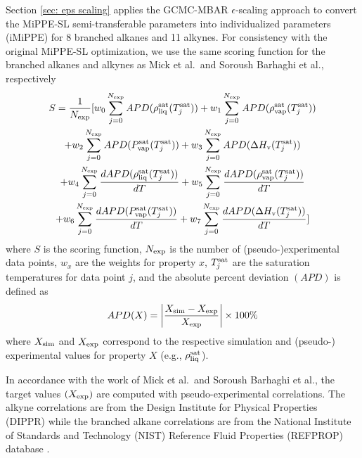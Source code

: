 \documentclass[journal=jced,manuscript=article]{achemso}
\begin{document}
Section \ref{sec: eps scaling} applies the GCMC-MBAR $\epsilon$-scaling approach to convert the MiPPE-SL semi-transferable parameters into individualized parameters (iMiPPE) for 8 branched alkanes and 11 alkynes. For consistency with the original MiPPE-SL optimization, we use the same scoring function for the branched alkanes and alkynes as Mick et al.~and Soroush Barhaghi et al., respectively
\begin{multline} \label{eq: Score}
S= \frac{1}{N_{\rm exp}} [ w_0 \sum_{j=0}^{N_{\rm exp}} APD(\rho_{\rm liq}^{\rm sat}(T^{\rm sat}_j)) + w_1 \sum_{j=0}^{N_{\rm exp}} APD(\rho_{\rm vap}^{\rm sat}(T^{\rm sat}_j)) \\ + w_2 \sum_{j=0}^{N_{\rm exp}} APD(P_{\rm vap}^{\rm sat}(T^{\rm sat}_j)) + w_3 \sum_{j=0}^{N_{\rm exp}} APD(\Delta H_{\rm v} (T^{\rm sat}_j)) \\ + w_4 \sum_{j=0}^{N_{\rm exp}} \frac{d APD(\rho_{\rm liq}^{\rm sat}(T^{\rm sat}_j))}{dT} + w_5 \sum_{j=0}^{N_{\rm exp}} \frac{d APD(\rho_{\rm vap}^{\rm sat}(T^{\rm sat}_j))}{dT} \\ + w_6 \sum_{j=0}^{N_{\rm exp}} \frac{d APD(P_{\rm vap}^{\rm sat}(T^{\rm sat}_j))}{dT} + w_7 \sum_{j=0}^{N_{\rm exp}} \frac{d APD(\Delta H_{\rm v} (T^{\rm sat}_j))}{dT} ]
\end{multline}
where $S$ is the scoring function, $N_{\rm exp}$ is the number of (pseudo-)experimental data points, $w_{x}$ are the weights for property $x$, $T^{\rm sat}_j$ are the saturation temperatures for data point $j$, and the absolute percent deviation $(APD)$ is defined as
\begin{equation} \label{eq: APD}
APD(X) = \left| \frac{X_{\rm sim} - X_{\rm exp}}{X_{\rm exp}} \right| \times 100 \% 
\end{equation}
where $X_{\rm sim}$ and $X_{\rm exp}$ correspond to the respective simulation and (pseudo-) experimental values for property $X$ (e.g., $\rho_{\rm liq}^{\rm sat}$).  

In accordance with the work of Mick et al.~and Soroush Barhaghi et al., the target values $(X_{\rm exp})$ are computed with pseudo-experimental correlations. The alkyne correlations are from the Design Institute for Physical Properties (DIPPR) \cite{DIPPR} while the branched alkane correlations are from the National Institute of Standards and Technology (NIST) Reference Fluid Properties (REFPROP) database \cite{LEMMON-RP10}.
\end{document}
